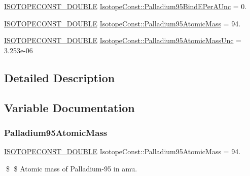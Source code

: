 \begin{DoxyCompactItemize}
\mbox{\hyperlink{group___isotope_const-_macros_ga8f45a7272ce02c0b4c65c44636ed719a}{I\+S\+O\+T\+O\+P\+E\+C\+O\+N\+S\+T\+\_\+\+D\+O\+U\+B\+LE}} \mbox{\hyperlink{group___isotope_const-_palladium-_pd95_gaaf3476574e510472ba6289a5806b381f}{Isotope\+Const\+::\+Palladium95\+Bind\+E\+Per\+A\+Unc}} = 0.
\item 
\mbox{\hyperlink{group___isotope_const-_macros_ga8f45a7272ce02c0b4c65c44636ed719a}{I\+S\+O\+T\+O\+P\+E\+C\+O\+N\+S\+T\+\_\+\+D\+O\+U\+B\+LE}} \mbox{\hyperlink{group___isotope_const-_palladium-_pd95_ga932b6c7028885bdb8593873f18cc66b5}{Isotope\+Const\+::\+Palladium95\+Atomic\+Mass}} = 94.
\item 
\mbox{\hyperlink{group___isotope_const-_macros_ga8f45a7272ce02c0b4c65c44636ed719a}{I\+S\+O\+T\+O\+P\+E\+C\+O\+N\+S\+T\+\_\+\+D\+O\+U\+B\+LE}} \mbox{\hyperlink{group___isotope_const-_palladium-_pd95_ga6d6ac90ae99ea803f99eafe6b70bee8e}{Isotope\+Const\+::\+Palladium95\+Atomic\+Mass\+Unc}} = 3.\+253e-\/06
\end{DoxyCompactItemize}


\subsection{Detailed Description}


\subsection{Variable Documentation}
\mbox{\label{group___isotope_const-_palladium-_pd95_ga932b6c7028885bdb8593873f18cc66b5}} 
\subsubsection{\texorpdfstring{Palladium95\+Atomic\+Mass}{Palladium95AtomicMass}}
{\footnotesize\ttfamily \mbox{\hyperlink{group___isotope_const-_macros_ga8f45a7272ce02c0b4c65c44636ed719a}{I\+S\+O\+T\+O\+P\+E\+C\+O\+N\+S\+T\+\_\+\+D\+O\+U\+B\+LE}} Isotope\+Const\+::\+Palladium95\+Atomic\+Mass = 94.}

\$ \$ Atomic mass of Palladium-\/95 in amu. \mbox{\label{group___isotope_const-_palladium-_pd95_ga6d6ac90ae99ea803f99eafe6b70bee8e}} 
